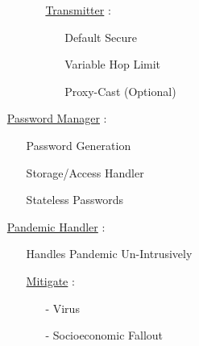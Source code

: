 \documentclass[11pt]{article}
\begin{document}
\begin{enumerate}
\begin{enumerate}
\begin{enumerate}
			\item[] \ul{Transmitter}  :
			\begin{enumerate}
				\item[] Default Secure
				\item[] Variable Hop Limit
				\item[] Proxy-Cast (Optional)
			\end{enumerate}
		\end{enumerate}
	\end{enumerate}
	
	\item[] \ul{Password Manager} :
	\begin{enumerate}
		\item[] Password Generation
		\item[] Storage/Access Handler
		\item[] Stateless Passwords
	\end{enumerate}
	
	\item[] \ul{Pandemic Handler} :
	\begin{enumerate}
		\item[] Handles Pandemic Un-Intrusively
		
		\item[] \ul{Mitigate} :
		\begin{enumerate}
			\item[-] Virus
			\item[-] Socioeconomic Fallout
		\end{enumerate}
	\end{enumerate}
	
\end{enumerate}
\end{document}
